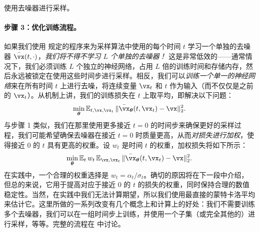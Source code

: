 \documentclass[../../book-main_zh.tex]{subfiles}
\begin{document}
\begin{algorithm}
	\caption{使用去噪器进行采样。}
	\label{alg:iterative_denoising}
	\begin{algorithmic}[1]
		 
		\EndFor
		\EndFunction
	\end{algorithmic}
\end{algorithm}

\paragraph{步骤 3：优化训练流程。} 如果我们使用  规定的程序来为采样算法中使用的每个时间 \(t\) 学习一个单独的去噪器 \(\bar{\vx}(t, \cdot)\)，\textit{我们将不得不学习 \(L\) 个单独的去噪器！} 这是非常低效的——通常情况下，我们必须训练 \(L\) 个独立的神经网络，占用 \(L\) 倍的训练时间和存储内存，然后永远被锁定在使用这些时间步进行采样。相反，我们可以\textit{训练一个单一的神经网络}来在所有时间 \(t\) 上进行去噪，将连续变量 \(\vx_{t}\) 和 \(t\) 作为输入（而不仅仅是之前的 \(\vx_{t}\)）。从机制上讲，我们的训练损失在 \(t\) 上取平均，即解决以下问题：
\begin{equation}
	\min_{\bm\theta}\Ex_{t, \vx, \vx_{t}}\norm{\bar{\vx}_{\bm\theta}(t, \vx_{t}) - \vx}_{2}^{2}.
\end{equation}
与步骤 1 类似，我们在那里使用更多接近 \(t = 0\) 的时间步来确保更好的采样过程，我们可能希望确保去噪器在接近 \(t = 0\) 时质量更高，从而\textit{对损失进行加权}，使得接近 \(0\) 的 \(t\) 具有更高的权重。设 \(w_{t}\) 是时间 \(t\) 的权重，加权损失将如下所示：
\begin{equation}\label{eq:parametric_denoising_loss}
	\min_{\bm\theta}\Ex_{t}w_{t}\Ex_{\vx, \vx_{t}}\norm{\bar{\vx}_{\bm\theta}(t, \vx_{t}) - \vx}_{2}^{2}.
\end{equation}
在实践中，一个合理的权重选择是 \(w_{t} = \alpha_{t}/\sigma_{t}\)。确切的原因将在下一段中介绍，但总的来说，它用于提高对应于接近 \(0\) 的 \(t\) 的损失的权重，同时保持合理的数值稳定性。当然，在实践中我们无法计算期望，所以我们使用最直接的蒙特卡洛平均来估计它。这里所做的一系列改变有几个概念上和计算上的好处：我们不需要训练多个去噪器，我们可以在一组时间步上训练，并使用一个子集（或完全其他的）进行采样，等等。完整的流程在  中讨论。
\end{document}
